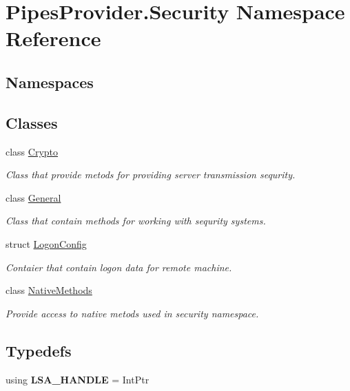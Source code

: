 \hypertarget{namespace_pipes_provider_1_1_security}{}\section{Pipes\+Provider.\+Security Namespace Reference}
\label{namespace_pipes_provider_1_1_security}
\subsection*{Namespaces}
\begin{DoxyCompactItemize}
\end{DoxyCompactItemize}
\subsection*{Classes}
\begin{DoxyCompactItemize}
\item 
class \mbox{\hyperlink{class_pipes_provider_1_1_security_1_1_crypto}{Crypto}}
\begin{DoxyCompactList}\small\item\em Class that provide metods for providing server transmission sequrity. \end{DoxyCompactList}\item 
class \mbox{\hyperlink{class_pipes_provider_1_1_security_1_1_general}{General}}
\begin{DoxyCompactList}\small\item\em Class that contain methods for working with sequrity systems. \end{DoxyCompactList}\item 
struct \mbox{\hyperlink{struct_pipes_provider_1_1_security_1_1_logon_config}{Logon\+Config}}
\begin{DoxyCompactList}\small\item\em Contaier that contain logon data for remote machine. \end{DoxyCompactList}\item 
class \mbox{\hyperlink{class_pipes_provider_1_1_security_1_1_native_methods}{Native\+Methods}}
\begin{DoxyCompactList}\small\item\em Provide access to native metods used in security namespace. \end{DoxyCompactList}\end{DoxyCompactItemize}
\subsection*{Typedefs}
\begin{DoxyCompactItemize}
\item 
\mbox{\label{namespace_pipes_provider_1_1_security_a12798908780706d7d5b56356a0329312}} 
using {\bfseries L\+S\+A\+\_\+\+H\+A\+N\+D\+LE} = Int\+Ptr
\end{DoxyCompactItemize}
